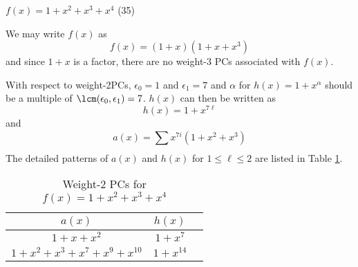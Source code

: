 \begin{example}
$f(x)=1+x^2+x^3+x^4$ (35)\newline

We may write $f(x)$ as 
$$f(x) =(1+x)(1+x+x^3)$$
and since $1+x$ is a factor, there are no weight-3 PCs associated with $f(x)$.

With respect to weight-2PCs, $\epsilon_0=1$ and $\epsilon_1=7$ and $\alpha$ for $h(x)=1+x^{\alpha}$ should be a multiple of $\lcm(\epsilon_0,\epsilon_1)=7$. $h(x)$ can then be written as 
$$h(x) =1+x^{7\ell}$$ and 
$$a(x) = \sum_{}^{}x^{7i}(1+x^2+x^3)$$
The detailed patterns of $a(x)$ and $h(x)$ for $1 \leq \ell \leq 2$ are listed in Table \ref{novelTab-extra2}.
\begin{table}[htbp]
 \caption{Weight-2 PCs for $f(x)=1+x^2+x^3+x^4$}
\centering
 \begin{tabular}{c c c} 
 \toprule
 $a(x)$ & $h(x)$ \\ [0.5ex] 
 \midrule
$1+x+x^2$
 & $1+x^{7}$ \\
\hline
$1+x^2+x^3+x^7+x^9+x^{10}$
 & $1+x^{14}$ \\
 \bottomrule
 \end{tabular}
 \label{novelTab-extra2}
\end{table}

\end{example}
